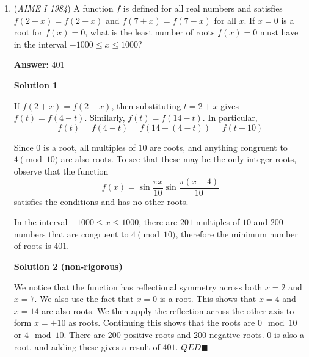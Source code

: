 \begin{enumerate}
 



\textbf{Solution 5}

Let's remove all of the birch trees so that were left with $3$ maple trees and $4$ oak trees. This can be arranged as $MMMOOOO$. Now, we can place the B's between the letters and at the ends. So, in total we have $8$ places to place the $B$'s and we have $5$ $B$'s to place so in total we have $\dbinom{8}{5}$ ways. Next, we have $\dbinom{12}{5}$ ways to arrange the trees, so our probability is 
 \[\dfrac{\dbinom{8}{5}}{\dbinom{12}{5}} = \dfrac{7}{99} \Longrightarrow \boxed{106}\]

 -jb2015007

 


	\item (\textit{AIME I 1984}) A function $f$ is defined for all real numbers and satisfies $f(2+x)=f(2-x)$ and $f(7+x)=f(7-x)$ for all $x$. If $x=0$ is a root for $f(x)=0$, what is the least number of roots $f(x)=0$ must have in the interval $-1000\leq x \leq 1000$?


 
 \textbf{Answer: }401



\textbf{Solution 1}

If $f(2+x)=f(2-x)$, then substituting $t=2+x$ gives $f(t)=f(4-t)$. Similarly, $f(t)=f(14-t)$. In particular,
 \[f(t)=f(4-t)=f(14-(4-t))=f(t+10)\]

 Since $0$ is a root, all multiples of $10$ are roots, and anything congruent to $4\pmod{10}$ are also roots. To see that these may be the only integer roots, observe that the function
 \[f(x) = \sin \frac{\pi x}{10}\sin \frac{\pi (x-4)}{10}\]satisfies the conditions and has no other roots.

 In the interval $-1000\leq x\leq 1000$, there are $201$ multiples of $10$ and $200$ numbers that are congruent to $4 \pmod{10}$, therefore the minimum number of roots is $\boxed{401}$.

 



\textbf{Solution 2 (non-rigorous)}

We notice that the function has reflectional symmetry across both $x=2$ and $x=7$. We also use the fact that $x=0$ is a root. This shows that $x=4$ and $x=14$ are also roots. We then apply the reflection across the other axis to form $x=\pm 10$ as roots. Continuing this shows that the roots are $0 \mod 10$ or $4 \mod 10$. There are 200 positive roots and 200 negative roots. 0 is also a root, and adding these gives a result of $\boxed{401}$. $QED \blacksquare$


\end{enumerate}
